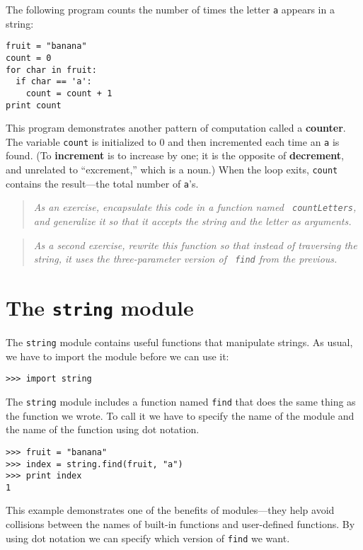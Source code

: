 The following program counts the number of times the letter {\tt a}
appears in a string:

\beforeverb
\begin{verbatim}
fruit = "banana"
count = 0
for char in fruit:
  if char == 'a':
    count = count + 1
print count
\end{verbatim}
\afterverb
%
This program demonstrates another pattern of computation called a {\bf
counter}.  The variable {\tt count} is initialized to 0 and then
incremented each time an {\tt a} is found.  (To {\bf increment} is to
increase by one; it is the opposite of {\bf decrement}, and unrelated
to ``excrement,'' which is a noun.)  When the loop exits, {\tt count}
contains the result---the total number of {\tt a}'s.

\begin{quote}
{\em As an exercise, encapsulate this code in a function named {\tt
countLetters}, and generalize it so that it accepts the string and the
letter as arguments.}
\end{quote}

\begin{quote}
{\em As a second exercise, rewrite this function so that instead of
traversing the string, it uses the three-parameter version of {\tt
find} from the previous.}
\end{quote}


\section{The {\tt string} module}

The {\tt string} module contains useful functions that
manipulate strings.  As usual, we have to import the module before
we can use it:

\beforeverb
\begin{verbatim}
>>> import string
\end{verbatim}
\afterverb
%
The {\tt string} module includes a function named {\tt find} that does
the same thing as the function we wrote.  To call it we have to
specify the name of the module and the name of the function using dot
notation.

\beforeverb
\begin{verbatim}
>>> fruit = "banana"
>>> index = string.find(fruit, "a")
>>> print index
1
\end{verbatim}
\afterverb
%
This example demonstrates one of the benefits of modules---they help
avoid collisions between the names of built-in functions and
user-defined functions.  By using dot notation we can specify which
version of {\tt find} we want.


